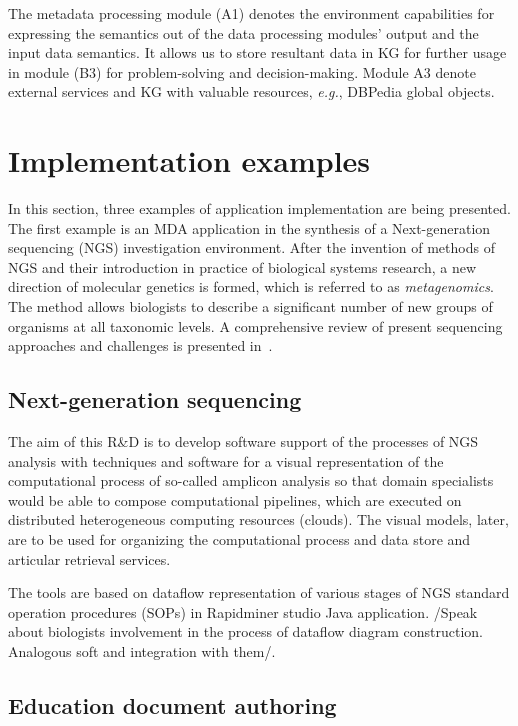 \documentclass[
]{ceurart}
\begin{document}
The metadata processing module (A1) denotes the environment capabilities for expressing the semantics out of the data processing modules' output and the input data semantics. It allows us to store resultant data in KG for further usage in module (B3) for problem-solving and decision-making. Module A3 denote external services and KG with valuable resources, \emph{e.g.}, DBPedia global objects.

\section{Implementation examples}

In this section, three examples of application implementation are being presented.  The first example is an MDA application in the synthesis of a Next-generation sequencing (NGS) investigation environment.  After the invention of methods of NGS and their introduction in practice of biological systems research, a new direction of molecular genetics is formed, which is referred to as \emph{metagenomics}.  The method allows biologists to describe a significant number of new groups of organisms at all taxonomic levels. A comprehensive review of present sequencing approaches and challenges is presented in~\cite{pere20}.

\subsection{Next-generation sequencing}
\label{sec:ngs-impl}


The aim of this R\&D is to develop software support of the processes of NGS analysis with techniques and software for a visual representation of the computational process of so-called amplicon analysis so that domain specialists would be able to compose computational pipelines, which are executed on distributed heterogeneous computing resources (clouds).  The visual models, later, are to be used for organizing the computational process and data store and articular retrieval services.

The tools are based on dataflow representation of various stages of NGS standard operation procedures (SOPs) in Rapidminer studio Java application.  /Speak about biologists involvement in the process of dataflow diagram construction. Analogous soft and integration with them/.

\subsection{Education document authoring}
\label{sec:doc-impl}
\end{document}
